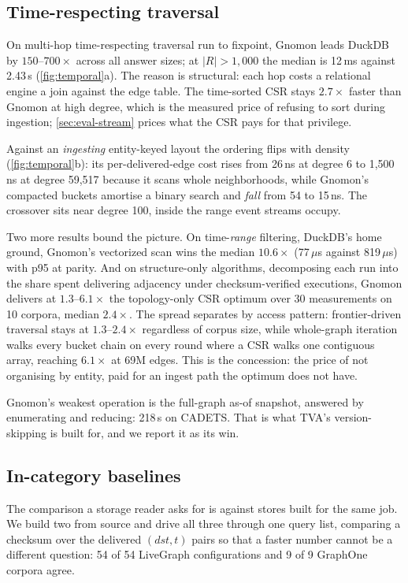 \documentclass[letterpaper,twocolumn,10pt]{article}
\newcommand{\sys}{Gnomon\xspace}
\begin{document}
\subsection{Time-respecting traversal}
\label{sec:eval-traversal}
On multi-hop time-respecting traversal run to fixpoint, \sys leads
DuckDB by $150$--$700\times$ across all answer sizes; at $|R|>1{,}000$
the median is 12\,ms against 2.43\,s (\cref{fig:temporal}a). The
reason is structural: each hop costs a relational engine a join
against the edge table. The time-sorted CSR stays $2.7\times$ faster
than \sys at high degree, which is the measured price of refusing to
sort during ingestion; \cref{sec:eval-stream} prices what the CSR pays
for that privilege.

Against an \emph{ingesting} entity-keyed layout the ordering flips with
density (\cref{fig:temporal}b): its per-delivered-edge cost rises from
26\,ns at degree 6 to 1{,}500\,ns at degree 59{,}517 because it scans
whole neighborhoods, while \sys's compacted buckets amortise a binary
search and \emph{fall} from 54 to 15\,ns. The crossover sits near
degree 100, inside the range event streams occupy.

Two more results bound the picture. On time-\emph{range} filtering,
DuckDB's home ground, \sys's vectorized scan wins the median
$10.6\times$ (77\,$\mu$s against 819\,$\mu$s) with p95 at parity. And on
structure-only algorithms, decomposing each run into the share spent
delivering adjacency under checksum-verified executions, \sys delivers
at $1.3$--$6.1\times$ the topology-only CSR optimum over 30 measurements
on 10 corpora, median $2.4\times$. The spread separates by access
pattern: frontier-driven traversal stays at $1.3$--$2.4\times$
regardless of corpus size, while whole-graph iteration walks every
bucket chain on every round where a CSR walks one contiguous array,
reaching $6.1\times$ at 69M edges. This is the concession: the price of
not organising by entity, paid for an ingest path the optimum does not
have.

\sys's weakest operation is the full-graph as-of snapshot, answered by
enumerating and reducing: 218\,s on CADETS. That is what TVA's
version-skipping is built for, and we report it as its win.


\subsection{In-category baselines}
\label{sec:eval-baselines}
The comparison a storage reader asks for is against stores built for
the same job. We build two from source and drive all three through one
query list, comparing a checksum over the delivered
$(\mathit{dst}, t)$ pairs so that a faster number cannot be a
different question: 54 of 54 LiveGraph configurations and 9 of 9
GraphOne corpora agree.
\end{document}
